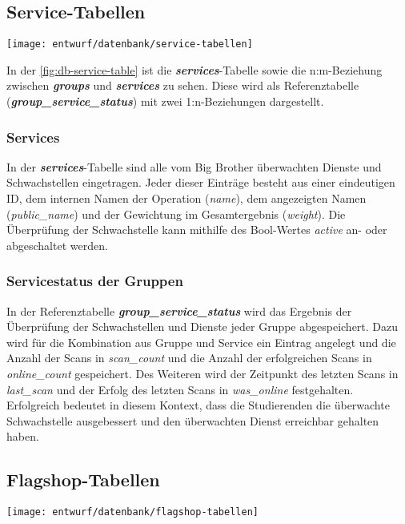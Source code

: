 \subsection{Service-Tabellen}
\begin{center}
	\texttt{[image: entwurf/datenbank/service-tabellen]}
	\label{fig:db-service-table}
\end{center}

In der \autoref{fig:db-service-table} ist die \textbf{\textit{services}}-Tabelle sowie die n:m-Beziehung zwischen \textbf{\textit{groups}} und \textbf{\textit{services}} zu sehen. Diese wird als Referenztabelle (\textbf{\textit{group\_service\_status}}) mit zwei 1:n-Beziehungen dargestellt.

\subsubsection{Services}
In der \textbf{\textit{services}}-Tabelle sind alle vom Big Brother überwachten Dienste und Schwachstellen eingetragen. Jeder dieser Einträge besteht aus einer eindeutigen ID, dem internen Namen der Operation (\textit{name}), dem angezeigten Namen (\textit{public\_name}) und der Gewichtung im Gesamtergebnis (\textit{weight}). Die Überprüfung der Schwachstelle kann mithilfe des Bool-Wertes \textit{active} an- oder abgeschaltet werden.

\subsubsection{Servicestatus der Gruppen}
In der Referenztabelle \textbf{\textit{group\_service\_status}} wird das Ergebnis der Überprüfung der Schwachstellen und Dienste jeder Gruppe abgespeichert. Dazu wird für die Kombination aus Gruppe und Service ein Eintrag angelegt und die Anzahl der Scans in \textit{scan\_count} und die Anzahl der erfolgreichen Scans in \textit{online\_count} gespeichert. Des Weiteren wird der Zeitpunkt des letzten Scans in \textit{last\_scan} und der Erfolg des letzten Scans in \textit{was\_online} festgehalten. Erfolgreich bedeutet in diesem Kontext, dass die Studierenden die überwachte Schwachstelle ausgebessert und den überwachten Dienst erreichbar gehalten haben.

\subsection{Flagshop-Tabellen}
\begin{center}
	\texttt{[image: entwurf/datenbank/flagshop-tabellen]}
	\label{fig:db-flagshop-table}
\end{center}

